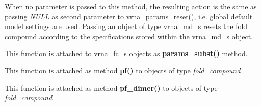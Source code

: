 \begin{DoxyRefList}
When no parameter is passed to this method, the resulting action is the same as passing {\itshape N\+U\+LL} as second parameter to \mbox{\hyperlink{group__energy__parameters_gac40dc82e48a72a97cfc58b9da08a7792}{vrna\+\_\+params\+\_\+reset()}}, i.\+e. global default model settings are used. Passing an object of type \mbox{\hyperlink{structvrna__md__s}{vrna\+\_\+md\+\_\+s}} resets the fold compound according to the specifications stored within the \mbox{\hyperlink{structvrna__md__s}{vrna\+\_\+md\+\_\+s}} object.  
\item[\label{wrappers__wrappers000043}%
\Hypertarget{wrappers__wrappers000043}%
Global \mbox{\hyperlink{group__energy__parameters_ga5d1909208f7ea3baa98b75afaa1f62ca}{vrna\+\_\+params\+\_\+subst}} (vrna\+\_\+fold\+\_\+compound\+\_\+t $\ast$vc, vrna\+\_\+param\+\_\+t $\ast$par)]This function is attached to \mbox{\hyperlink{group__fold__compound_structvrna__fc__s}{vrna\+\_\+fc\+\_\+s}} objects as {\bfseries params\+\_\+subst()} method.  
\item[\label{wrappers__wrappers000047}%
\Hypertarget{wrappers__wrappers000047}%
Global \mbox{\hyperlink{group__pf__fold_ga29e256d688ad221b78d37f427e0e99bc}{vrna\+\_\+pf}} (vrna\+\_\+fold\+\_\+compound\+\_\+t $\ast$vc, char $\ast$structure)]This function is attached as method {\bfseries pf()} to objects of type {\itshape fold\+\_\+compound}  
\item[\label{wrappers__wrappers000048}%
\Hypertarget{wrappers__wrappers000048}%
Global \mbox{\hyperlink{group__pf__cofold_ga4e5c7d06c302a7c59fc0d64dc142ca63}{vrna\+\_\+pf\+\_\+dimer}} (vrna\+\_\+fold\+\_\+compound\+\_\+t $\ast$vc, char $\ast$structure)]This function is attached as method {\bfseries pf\+\_\+dimer()} to objects of type {\itshape fold\+\_\+compound}  
\item[\label{wrappers__wrappers000015}%
\Hypertarget{wrappers__wrappers000015}%
Global \mbox{\hyperlink{group__soft__constraints_gaf162aedac7422f2eb16ea030f47d2f4b}{vrna\+\_\+sc\+\_\+add\+\_\+bp}} (vrna\+\_\+fold\+\_\+compound\+\_\+t $\ast$vc, int i, int j, F\+L\+T\+\_\+\+O\+R\+\_\+\+D\+BL energy, unsigned int options)]


\end{DoxyRefList}
